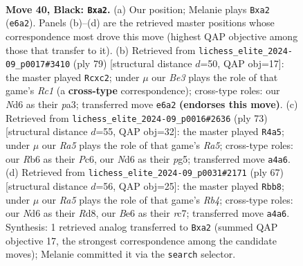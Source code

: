\documentclass[11pt]{article}
\begin{document}
\clearpage

\begin{figure}[p]\centering
\begin{subfigure}{0.46\textwidth}\centering
\resizebox{\linewidth}{!}{%
\newchessgame
\chessboard[
  setfen={5k2/7R/1r1nb3/1p4p1/r7/2B1P1P1/P4PKP/4R3 b - - 0 40},
  showmover=false,
  pgfstyle=straightmove, color=movearrow, markmove={e6-a2}
]}
\caption{}
\end{subfigure}\hfill
\begin{subfigure}{0.46\textwidth}\centering
\resizebox{\linewidth}{!}{%
\newchessgame
\chessboard[
  setfen={2r3k1/6p1/7p/7P/1R3P2/P3B3/KPP3r1/8 b - - 0 40},
  showmover=false,
  pgfstyle=straightmove, color=movearrow, markmove={c8-c2}
]}
\caption{}
\end{subfigure}
\\[4pt]
\begin{subfigure}{0.46\textwidth}\centering
\resizebox{\linewidth}{!}{%
\newchessgame
\chessboard[
  setfen={r5k1/5pp1/2p1b3/6PR/r7/4BPP1/P3PK2/3R4 b - - 1 37},
  showmover=false,
  pgfstyle=straightmove, color=movearrow, markmove={a4-a5}
]}
\caption{}
\end{subfigure}\hfill
\begin{subfigure}{0.46\textwidth}\centering
\resizebox{\linewidth}{!}{%
\newchessgame
\chessboard[
  setfen={3r2k1/2R3p1/p7/1r3p1p/5B1P/1P3KP1/2P2P2/8 b - - 0 34},
  showmover=false,
  pgfstyle=straightmove, color=movearrow, markmove={b5-b8}
]}
\caption{}
\end{subfigure}
\caption{\textbf{Move 40, Black: \texttt{Bxa2}.} (a) Our position; Melanie plays \texttt{Bxa2} (\texttt{e6a2}). Panels (b)--(d) are the retrieved master positions whose correspondence most drove this move (highest QAP objective among those that transfer to it). (b) Retrieved from \texttt{lichess\_elite\_2024-09\_p0017\#3410} (ply 79) [structural distance $d$=50, QAP obj=17]: the master played \texttt{Rcxc2}; under $\mu$ our \emph{Be3} plays the role of that game's \emph{Rc1} (a \textbf{cross-type} correspondence); cross-type roles: our \emph{N}d6 as their \emph{p}a3; transferred move \texttt{e6a2} \textbf{(endorses this move)}. (c) Retrieved from \texttt{lichess\_elite\_2024-09\_p0016\#2636} (ply 73) [structural distance $d$=55, QAP obj=32]: the master played \texttt{R4a5}; under $\mu$ our \emph{Ra5} plays the role of that game's \emph{Ra5}; cross-type roles: our \emph{R}b6 as their \emph{P}c6, our \emph{N}d6 as their \emph{p}g5; transferred move \texttt{a4a6}. (d) Retrieved from \texttt{lichess\_elite\_2024-09\_p0031\#2171} (ply 67) [structural distance $d$=56, QAP obj=25]: the master played \texttt{Rbb8}; under $\mu$ our \emph{Ra5} plays the role of that game's \emph{Rb4}; cross-type roles: our \emph{N}d6 as their \emph{R}d8, our \emph{B}e6 as their \emph{r}c7; transferred move \texttt{a4a6}. Synthesis: 1 retrieved analog transferred to \texttt{Bxa2} (summed QAP objective 17, the strongest correspondence among the candidate moves); Melanie committed it via the \texttt{search} selector.}
\label{fig:thought-m79}
\end{figure}
\end{document}
